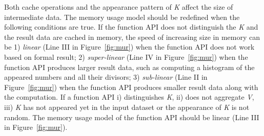 Both cache operations and the appearance pattern of \textit{K} affect the  size of intermediate data. 
The memory usage model should be redefined when the following conditions are true.
If the function API does not distinguish the \textit{K} and the result data are cached in memory, the speed of increasing size in memory can be 1) \textit{linear} (Line III in Figure~\ref{fig:mur}) when the function API does not work based on formal result; 2) \textit{super-linear} (Line IV in Figure~\ref{fig:mur}) when the function API produces larger result data, such as computing a histogram of the appeared numbers and all their divisors; 3) \textit{sub-linear} (Line II in Figure~\ref{fig:mur}) when the function API produces smaller result data along with the computation.
If a function API i) distinguishes \textit{K}, ii) does not aggregate \textit{V}, iii) \textit{K} has not appeared yet in the input dataset or the appearance of \textit{K} is not random. The memory usage model of the function API should be linear (Line III in Figure~\ref{fig:mur}).

\begin{comment}
\begin{itemize}

\item If the function API does not distinguish the \textit{K} and the result data are cached in memory, the speed of increasing size in memory can be 1) \textit{linear} (Line III in Figure~\ref{fig:mur}) when the function API does not work based on formal result; 2) \textit{super-linear} (Line IV in Figure~\ref{fig:mur}) when the function API produces larger result data, such as computing a histogram of the appeared numbers and all their divisors; 3) \textit{sub-linear} (Line II in Figure~\ref{fig:mur}) when the function API produces smaller result data along with the computation. 

\item If a function API i) distinguishes \textit{K}, ii) does not aggregate \textit{V}, iii) \textit{K} has not appeared yet in the input dataset or the appearance of \textit{K} is not random. The memory usage model of the function API should be linear.

\end{itemize}
\end{comment}

